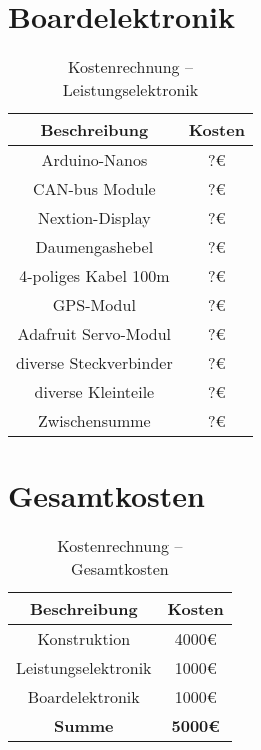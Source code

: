\section{Boardelektronik}
\begin{table}[H]
    \centering
    \begin{tabular}{|c|c|}
        \hline
        \textbf{Beschreibung} & \textbf{Kosten}\\\hline
        Arduino-Nanos & ?\euro\\
        CAN-bus Module & ?\euro\\
        Nextion-Display & ?\euro\\
        Daumengashebel & ?\euro\\
        4-poliges Kabel 100m & ?\euro\\
        GPS-Modul & ?\euro\\
        Adafruit Servo-Modul & ?\euro\\
        diverse Steckverbinder & ?\euro\\
        diverse Kleinteile & ?\euro\\
        \hline
        Zwischensumme & ?\euro\\\hline
    \end{tabular}
    \caption{Kostenrechnung -- Leistungselektronik}
\end{table}

\section{Gesamtkosten}
\begin{table}[H]
    \centering
    \begin{tabular}{|c|c|}
        \hline
        \textbf{Beschreibung} & \textbf{Kosten}\\\hline
        Konstruktion & 4000\euro\\
        Leistungselektronik & 1000\euro\\
        Boardelektronik & 1000\euro\\
        \hline
        \textbf{Summe} & \textbf{5000\euro}\\\hline
    \end{tabular}
    \caption{Kostenrechnung -- Gesamtkosten}
\end{table}

